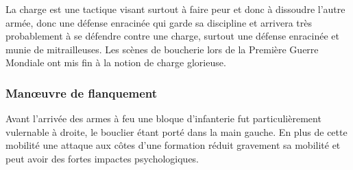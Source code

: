 \documentclass{article}
\begin{document}
La charge est une tactique visant surtout à faire peur et donc à dissoudre l'autre armée, donc une défense enracinée qui garde sa discipline et arrivera très probablement à se défendre contre une charge, surtout une défense enracinée et munie de mitrailleuses. Les scènes de boucherie lors de la Première Guerre Mondiale ont mis fin à la notion de charge glorieuse.

\subsubsection{Manœuvre de flanquement}
Avant l'arrivée des armes à feu une bloque d'infanterie fut particulièrement vulernable à droite, le bouclier étant porté dans la main gauche. En plus de cette mobilité une attaque aux côtes d'une formation réduit gravement sa mobilité et peut avoir des fortes impactes psychologiques. 
\end{document}
